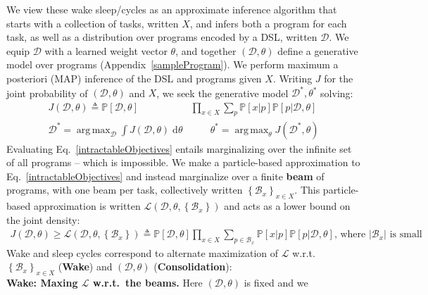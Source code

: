\documentclass{article}
\newcommand{\lowerBound}{\mathscr{L}}
\DeclareMathOperator*{\argmax}{arg\,max} %
\newcommand{\probability}{\mathds{P}} %
\begin{document}
We view these wake sleep/cycles as an approximate inference algorithm that starts with a collection of tasks, written $X$, and infers both a program for each task, as well
as a distribution over programs encoded by a DSL, written
$\mathcal{D}$.  We equip $\mathcal{D}$ with a learned weight vector
$\theta$, and together $(\mathcal{D},\theta)$ define a generative
model over programs (Appendix~\ref{sampleProgram}).  We perform
maximum a posteriori (MAP) inference of the DSL and programs given
$X$.  Writing $J$ for the joint probability of $(\mathcal{D},\theta)$
and $X$, we seek the generative model $\mathcal{D}^*,\theta^*$ solving:
\begin{align}\label{intractableObjectives}
\nonumber  J(\mathcal{D},\theta)\triangleq \probability[\mathcal{D},\theta]&\prod_{x\in X} \sum_p \probability[x|p]\probability[p|\mathcal{D},\theta]\\
  \mathcal{D}^* = \argmax_{\mathcal{D}}\int J(\mathcal{D},\theta)\;\mathrm{d}\theta &\qquad
  \theta^* =\argmax_\theta J(\mathcal{D}^*,\theta)
\end{align}
Evaluating Eq.~\ref{intractableObjectives}
entails marginalizing over the infinite set of all programs -- which is impossible.
We make a particle-based approximation to Eq.~\ref{intractableObjectives}
and instead marginalize over a finite \textbf{beam} of programs,
with one beam per task, collectively written $\left\{\mathcal{B}_x \right\}_{x\in X}$.
This particle-based approximation is written $\lowerBound (\mathcal{D},\theta,\left\{\mathcal{B}_x \right\})$
and acts as a lower bound on the joint density:
\begin{align}
 J(\mathcal{D},\theta)\geq \lowerBound  (\mathcal{D},\theta,\left\{\mathcal{B}_x \right\})\triangleq\probability[\mathcal{D},\theta]\prod_{x\in X} \sum_{p\in \mathcal{B}_x} \probability[x|p]\probability[p|\mathcal{D},\theta]\text{, where $|\mathcal{B}_x|$ is small}
\end{align}
Wake and sleep cycles correspond to alternate maximization of $\lowerBound$ w.r.t. $\left\{\mathcal{B}_x \right\}_{x\in X}$  (\textbf{Wake})
and $(\mathcal{D},\theta)$ (\textbf{Consolidation}):
\\\noindent \textbf{Wake: Maxing $\lowerBound$ w.r.t.\ the beams.} Here $(\mathcal{D},\theta)$ is fixed and we
\end{document}
